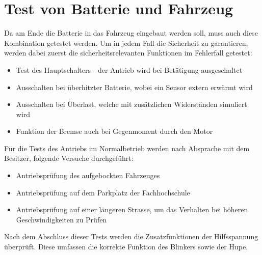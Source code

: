 \section{Test von Batterie und Fahrzeug}
Da am Ende die Batterie in das Fahrzeug eingebaut werden soll, muss auch diese Kombination getestet werden. Um in jedem Fall die Sicherheit zu garantieren, werden dabei zuerst die sicherheitsrelevanten Funktionen im Fehlerfall getestet: \begin{itemize}
	\item Test des Hauptschalters - der Antrieb wird bei Betätigung ausgeschaltet
	\item Ausschalten bei überhitzter Batterie, wobei ein Sensor extern erwärmt wird
	\item Ausschalten bei Überlast, welche mit zusätzlichen Widerständen simuliert wird
	\item Funktion der Bremse auch bei Gegenmoment durch den Motor
\end{itemize}

Für die Tests des Antriebs im Normalbetrieb werden nach Absprache mit dem Besitzer, folgende Versuche durchgeführt: \begin{itemize}
	\item Antriebsprüfung des aufgebockten Fahrzeuges
	\item Antriebsprüfung auf dem Parkplatz der Fachhochschule
	\item Antriebsprüfung auf einer längeren Strasse, um das Verhalten bei höheren Geschwindigkeiten zu Prüfen
\end{itemize}

Nach dem Abschluss dieser Tests werden die Zusatzfunktionen der Hilfsspannung überprüft. Diese umfassen die korrekte Funktion des Blinkers sowie der Hupe.